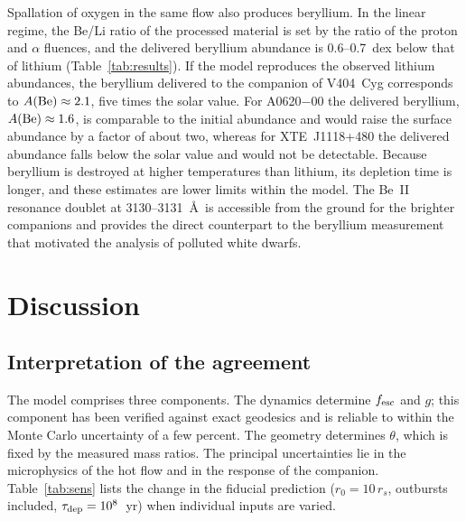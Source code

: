 \documentclass[twocolumn,showpacs,preprintnumbers,amsmath,amssymb]{revtex4}
\begin{document}
Spallation of oxygen in the same flow also produces beryllium. In the linear regime, the Be/Li ratio of the processed material is set by the ratio of the proton and $\alpha$ fluences, and the delivered beryllium abundance is 0.6--0.7~dex below that of lithium (Table~\ref{tab:results}). If the model reproduces the observed lithium abundances, the beryllium delivered to the companion of V404~Cyg corresponds to $A({\rm Be})\approx2.1$, five times the solar value. For A0620$-$00 the delivered beryllium, $A({\rm Be})\approx1.6$, is comparable to the initial abundance and would raise the surface abundance by a factor of about two, whereas for XTE~J1118+480 the delivered abundance falls below the solar value and would not be detectable. Because beryllium is destroyed at higher temperatures than lithium, its depletion time is longer, and these estimates are lower limits within the model. The Be~II resonance doublet at 3130--3131~\AA\ is accessible from the ground for the brighter companions and provides the direct counterpart to the beryllium measurement that motivated the analysis of polluted white dwarfs.


\section{\label{sec:discussion} Discussion}

\subsection{Interpretation of the agreement}

The model comprises three components. The dynamics determine $f_{\rm esc}$ and $g$; this component has been verified against exact geodesics and is reliable to within the Monte Carlo uncertainty of a few percent. The geometry determines $\theta$, which is fixed by the measured mass ratios. The principal uncertainties lie in the microphysics of the hot flow and in the response of the companion. Table~\ref{tab:sens} lists the change in the fiducial prediction ($r_0 = 10\,r_s$, outbursts included, $\tau_{\rm dep} = 10^8$~yr) when individual inputs are varied.
\end{document}

